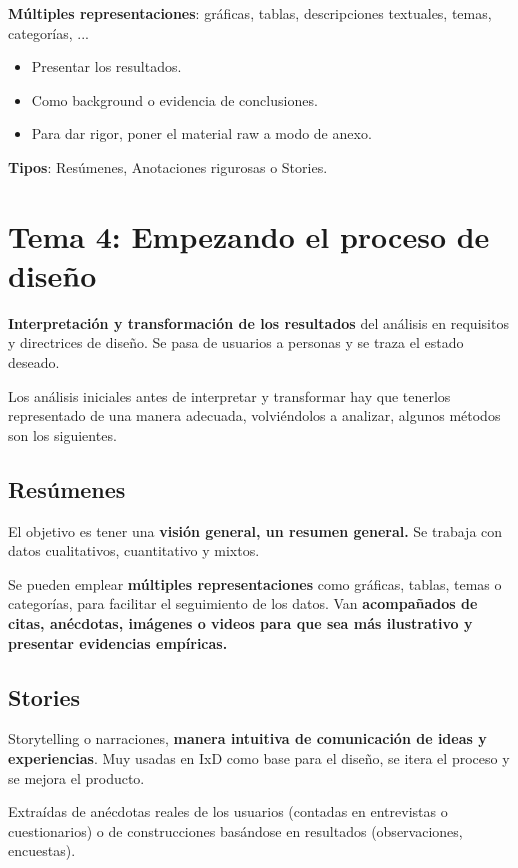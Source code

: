 \documentclass[12pt]{report} %
\begin{document}
\textbf{Múltiples representaciones}: gráficas, tablas, descripciones textuales, temas, categorías, ...

\begin{itemize}
\item
  Presentar los resultados.
\item
  Como background o evidencia de conclusiones.
\item
  Para dar rigor, poner el material raw a modo de anexo.
\end{itemize}

\textbf{Tipos}: Resúmenes, Anotaciones rigurosas o Stories.

\chapter{Tema 4: Empezando el proceso de diseño}

\textbf{Interpretación y transformación de los resultados} del análisis
en requisitos y directrices de diseño. Se pasa de usuarios a personas y
se traza el estado deseado.

Los análisis iniciales antes de interpretar y transformar hay que
tenerlos representado de una manera adecuada, volviéndolos a analizar,
algunos métodos son los siguientes.

\section{Resúmenes}

El objetivo es tener una \textbf{visión general, un resumen general.} Se
trabaja con datos cualitativos, cuantitativo y mixtos.

Se pueden emplear \textbf{múltiples representaciones} como gráficas,
tablas, temas o categorías, para facilitar el seguimiento de los datos.
Van \textbf{acompañados de citas, anécdotas, imágenes o videos para que
sea más ilustrativo y presentar evidencias empíricas.}

\section{Stories}

Storytelling o narraciones, \textbf{manera intuitiva de comunicación de
ideas y experiencias}. Muy usadas en IxD como base para el diseño, se
itera el proceso y se mejora el producto.

Extraídas de anécdotas reales de los usuarios (contadas en entrevistas o
cuestionarios) o de construcciones basándose en resultados (observaciones,
encuestas).
\end{document}
